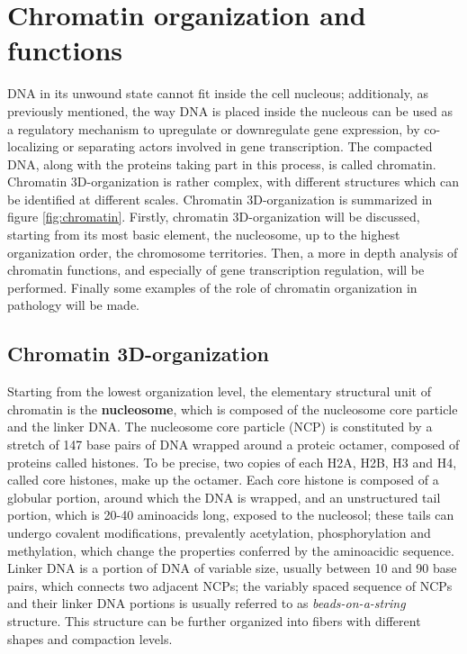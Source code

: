 \section{Chromatin organization and functions}

DNA in its unwound state cannot fit inside the cell nucleous; additionaly, as previously mentioned, the way DNA is placed inside the nucleous can be used as a regulatory mechanism to upregulate or downregulate gene expression, by co-localizing or separating actors involved in gene transcription. The compacted DNA, along with the proteins taking part in this process, is called chromatin. Chromatin 3D-organization is rather complex, with different structures which can be identified at different scales\cite{chromatinorganization2019, chromatindevelopment2019}. Chromatin 3D-organization is summarized in figure \ref{fig:chromatin}. Firstly, chromatin 3D-organization will be discussed, starting from its most basic element, the nucleosome, up to the highest organization order, the chromosome territories. Then, a more in depth analysis of chromatin functions, and especially of gene transcription regulation, will be performed. Finally some examples of the role of chromatin organization in pathology will be made.

\subsection{Chromatin 3D-organization}

Starting from the lowest organization level, the elementary structural unit of chromatin is the \textbf{nucleosome}, which is composed of the nucleosome core particle and the linker DNA. The nucleosome core particle (NCP) is constituted by a stretch of 147 base pairs of DNA wrapped around a proteic octamer, composed of proteins called histones. To be precise, two copies of each H2A, H2B, H3 and H4, called core histones, make up the octamer\cite{nucleosomecore1997}. Each core histone is composed of a globular portion, around which the DNA is wrapped, and an unstructured tail portion, which is 20-40 aminoacids long, exposed to the nucleosol; these tails can undergo covalent modifications, prevalently acetylation, phosphorylation and methylation, which change the properties conferred by the aminoacidic sequence\cite{histonemodifications2020}. Linker DNA is a portion of DNA of variable size, usually between 10 and 90 base pairs, which connects two adjacent NCPs; the variably spaced sequence of NCPs and their linker DNA portions is usually referred to as \emph{beads-on-a-string} structure. This structure can be further organized into fibers with different shapes and compaction levels\cite{chromatinfiber2015}.

